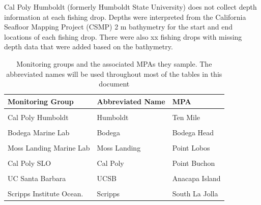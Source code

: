 \documentclass[
]{article}
\begin{document}
Cal Poly Humboldt (formerly Humboldt State University) does not collect depth
information at each fishing drop. Depths
were interpreted from the California Seafloor Mapping Project (CSMP) 2 m bathymetry
for the start and end locations of each fishing drop. There were also xx fishing
drops with missing depth data that were added based on the bathymetry.

\begin{table}

\caption{\label{tab:monitoring}Monitoring groups and the associated MPAs they sample. The abbreviated names will be 
  used throughout most of the tables in this document}
\centering
\begin{tabular}[t]{lll}
\toprule
Monitoring Group & Abbreviated Name & MPA\\
\midrule
\cellcolor{gray!6}{Cal Poly Humboldt} & \cellcolor{gray!6}{Humboldt} & \cellcolor{gray!6}{South Cape Mendocino}\\
Cal Poly Humboldt & Humboldt & Ten Mile\\
\cellcolor{gray!6}{Bodega Marine Lab} & \cellcolor{gray!6}{Bodega} & \cellcolor{gray!6}{Stewarts Point}\\
Bodega Marine Lab & Bodega & Bodega Head\\
\cellcolor{gray!6}{Moss Landing Marine Lab} & \cellcolor{gray!6}{Moss Landing} & \cellcolor{gray!6}{Ano Nuevo}\\
\addlinespace
Moss Landing Marine Lab & Moss Landing & Point Lobos\\
\cellcolor{gray!6}{Cal Poly SLO} & \cellcolor{gray!6}{Cal Poly} & \cellcolor{gray!6}{Piedras Blancas}\\
Cal Poly SLO & Cal Poly & Point Buchon\\
\cellcolor{gray!6}{UC Santa Barbara} & \cellcolor{gray!6}{UCSB} & \cellcolor{gray!6}{Carrington Point}\\
UC Santa Barbara & UCSB & Anacapa Island\\
\addlinespace
\cellcolor{gray!6}{Scripps Institute Ocean.} & \cellcolor{gray!6}{Scripps} & \cellcolor{gray!6}{Swamis}\\
Scripps Institute Ocean. & Scripps & South La Jolla\\
\bottomrule
\end{tabular}
\end{table}

\newpage
\end{document}
